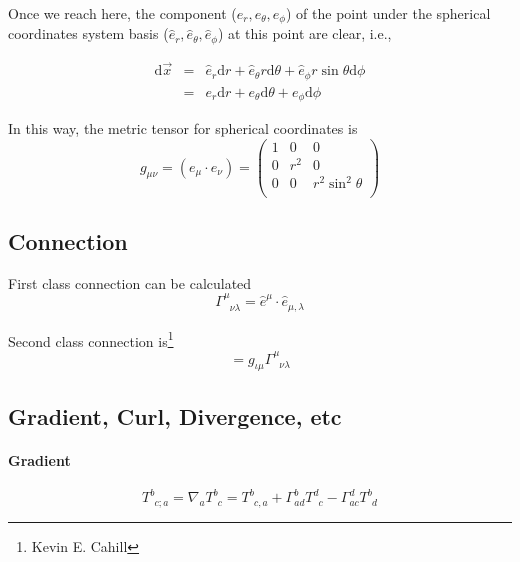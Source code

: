 \documentclass[12pt,a4paper]{book}
\begin{document}
Once we reach here, the component ($e_r ,e_\theta, e_\phi$) of the point under the spherical coordinates system basis ($\hat e_r, \hat e_\theta, \hat e_\phi$) at this point are clear, i.e.,

\begin{eqnarray}
\mathrm d\vec x&=&\hat e_r\mathrm d r+\hat e_\theta r\mathrm d \theta+\hat e_\phi r\sin\theta \mathrm d\phi \\
&=&e_r\mathrm d r+e_\theta \mathrm d\theta+e_\phi \mathrm d\phi
\end{eqnarray}

In this way, the metric tensor for spherical coordinates is 
\begin{equation}
g_{\mu\nu}=(e_\mu\cdot e_\nu)=\left(\begin{matrix}
1 &0&0 \\
0& r^2&0 \\
0&0& r^2\sin^2\theta \\
\end{matrix}\right)
\end{equation}



\subsection{Connection}

First class connection can be calculated 
\begin{equation}
\Gamma^\mu_{\phantom{\mu}\nu\lambda}=\hat e^\mu\cdot \hat e_{\mu,\lambda}
\end{equation}

Second class connection is\footnote{Kevin E. Cahill}
\begin{equation}
[\mu\nu,\iota]=g_{\iota\mu}\Gamma^\mu_{\phantom{\mu}\nu\lambda}
\end{equation}




\subsection{Gradient, Curl, Divergence, etc}

\paragraph{Gradient} 
\begin{equation}
T^b_{\phantom bc;a}= \nabla_aT^b_{\phantom bc}=T^b_{\phantom bc,a}+\Gamma^b_{ad}T^d_{\phantom dc}-\Gamma^d_{ac}T^b_{\phantom bd}
\end{equation}
\end{document}
